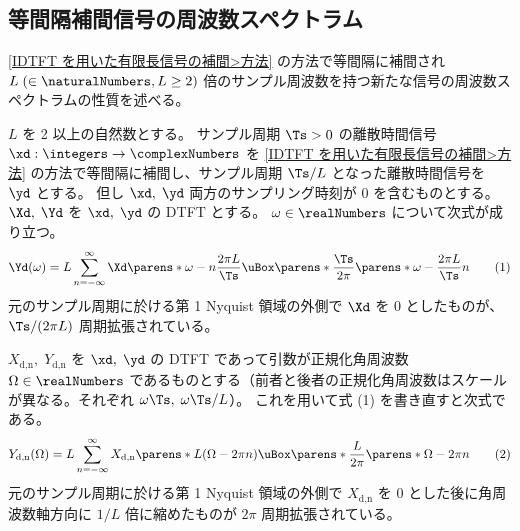         \subsection{等間隔補間信号の周波数スペクトラム}
            \newcommand{\Xdn}{X_\text{d,n}}
            \newcommand{\Ydn}{Y_\text{d,n}}
            \ref{IDTFT を用いた有限長信号の補間>方法} の方法で等間隔に補間され $L\;(\in\naturalNumbers,L\geq 2)$ 倍のサンプル周波数を持つ新たな信号の周波数スペクトラムの性質を述べる。
            \begin{shadebox}
                $L$ を 2 以上の自然数とする。
                サンプル周期 $\Ts>0$ の離散時間信号 $\xd:\integers\to\complexNumbers$ を \ref{IDTFT を用いた有限長信号の補間>方法} の方法で等間隔に補間し、サンプル周期 $\Ts/L$ となった離散時間信号を $\yd$ とする。
                但し $\xd,\;\yd$ 両方のサンプリング時刻が 0 を含むものとする。
                $\Xd,\;\Yd$ を $\xd,\;\yd$ の DTFT とする。
                $\omega\in\realNumbers$ について次式が成り立つ。
                \[ \Yd(\omega) = L\sum_{n=-\infty}^\infty \Xd\parens*{\omega-n\frac{2\pi L}{\Ts}}\uBox\parens*{\frac{\Ts}{2\pi}\parens*{\omega-\frac{2\pi L}{\Ts}n}} \tag{1} \]
                元のサンプル周期に於ける第 1 Nyquist 領域の外側で $\Xd$ を 0 としたものが、 $\Ts/(2\pi L)$ 周期拡張されている。
                \par
                $\Xdn,\;\Ydn$ を $\xd,\;\yd$ の DTFT であって引数が正規化角周波数 $\Omega\in\realNumbers$ であるものとする（前者と後者の正規化角周波数はスケールが異なる。それぞれ $\omega\Ts,\;\omega\Ts/L$）。
                これを用いて式 (1) を書き直すと次式である。
                \[ \Ydn(\Omega) = L\sum_{n=-\infty}^\infty \Xdn\parens*{L(\Omega-2\pi n)}\uBox\parens*{\frac{L}{2\pi}\parens*{\Omega-2\pi n}} \tag{2} \]
                元のサンプル周期に於ける第 1 Nyquist 領域の外側で $\Xdn$ を 0 とした後に角周波数軸方向に $1/L$ 倍に縮めたものが $2\pi$ 周期拡張されている。
            \end{shadebox}
